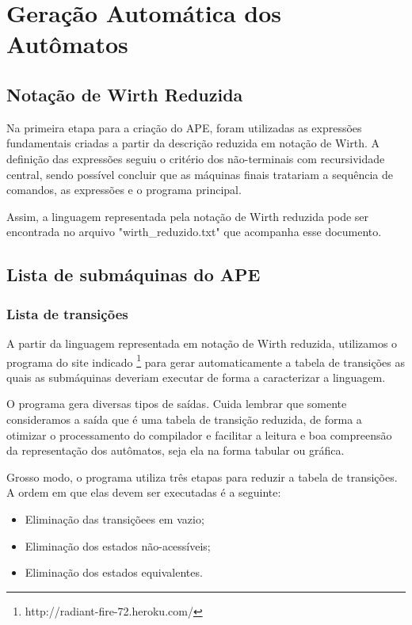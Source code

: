 \documentclass[12pt,oneside,a4paper,english]{abntex2}
\begin{document}
\chapter{Geração Automática dos Autômatos}
  \section{Notação de Wirth Reduzida}

    Na primeira etapa para a criação do APE, foram utilizadas as expressões fundamentais criadas a partir da descrição reduzida em notação de Wirth. A definição das expressões seguiu o critério dos não-terminais com recursividade central, sendo possível concluir que as máquinas finais tratariam a sequência de comandos, as expressões e o programa principal.


    Assim, a linguagem representada pela notação de Wirth reduzida pode ser encontrada no arquivo "wirth\_reduzido.txt" que acompanha esse documento.
    


  \section{Lista de submáquinas do APE}
    \subsection{Lista de transições}

      A partir da linguagem representada em notação de Wirth reduzida, utilizamos o programa do site indicado \footnote{http://radiant-fire-72.heroku.com/} para gerar automaticamente a tabela de transições as quais as submáquinas deveriam executar de forma a caracterizar a linguagem.


      O programa gera diversas tipos de saídas. Cuida lembrar que somente consideramos a saída que é uma tabela de transição reduzida, de forma a otimizar o processamento do compilador e facilitar a leitura e boa compreensão da representação dos autômatos, seja ela na forma tabular ou gráfica.


      Grosso modo, o programa utiliza três etapas para reduzir a tabela de transições. A ordem em que elas devem ser executadas é a seguinte:


      \begin{itemize}
        \item Eliminação das transiçõees em vazio;
        \item Eliminação dos estados não-acessíveis;
        \item Eliminação dos estados equivalentes.
      \end{itemize}
\end{document}
